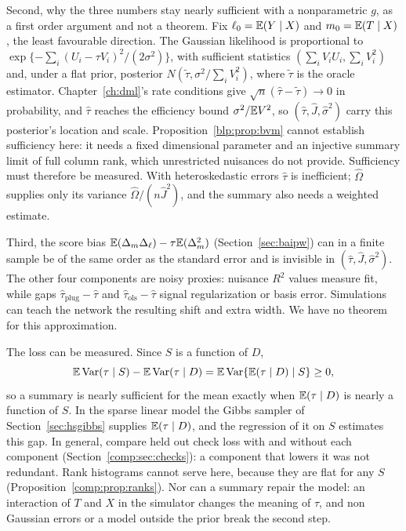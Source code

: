 Second, why the three numbers stay nearly sufficient with a nonparametric $g$, as a first order argument and not a theorem. Fix $\ell_0=\mathbb{E}(Y\mid X)$ and $m_0=\mathbb{E}(T\mid X)$, the least favourable direction. The Gaussian likelihood is proportional to $\exp\{-\sum_i(U_i-\tau V_i)^2/(2\sigma^2)\}$, with sufficient statistics $(\sum_iV_iU_i,\sum_iV_i^2)$ and, under a flat prior, posterior $N(\tilde\tau,\sigma^2/\sum_iV_i^2)$, where $\tilde\tau$ is the oracle estimator. Chapter~\ref{ch:dml}'s rate conditions give $\sqrt n(\hat\tau-\tilde\tau)\to0$ in probability, and $\hat\tau$ reaches the efficiency bound $\sigma^2/\mathbb{E} V^2$, so $(\hat\tau,\hat J,\hat\sigma^2)$ carry this posterior's location and scale. Proposition~\ref{blp:prop:bvm} cannot establish sufficiency here: it needs a fixed dimensional parameter and an injective summary limit of full column rank, which unrestricted nuisances do not provide. Sufficiency must therefore be measured. With heteroskedastic errors $\hat\tau$ is inefficient; $\hat\Omega$ supplies only its variance $\hat\Omega/(n\hat J^2)$, and the summary also needs a weighted estimate.

Third, the score bias $\mathbb{E}(\Delta_m\Delta_\ell)-\tau\mathbb{E}(\Delta_m^2)$ (Section~\ref{sec:baipw}) can in a finite sample be of the same order as the standard error and is invisible in $(\hat\tau,\hat J,\hat\sigma^2)$. The other four components are noisy proxies: nuisance $R^2$ values measure fit, while gaps $\hat\tau_{\mathrm{plug}}-\hat\tau$ and $\hat\tau_{\mathrm{ols}}-\hat\tau$ signal regularization or basis error. Simulations can teach the network the resulting shift and extra width. We have no theorem for this approximation.

The loss can be measured. Since $S$ is a function of $D$,
\[
\mathbb{E}\,\mathrm{Var}(\tau \mid S) - \mathbb{E}\,\mathrm{Var}(\tau \mid D) = \mathbb{E}\,\mathrm{Var}\{\mathbb{E}(\tau \mid D) \mid S\} \geq 0,
\]
so a summary is nearly sufficient for the mean exactly when $\mathbb{E}(\tau \mid D)$ is nearly a function of $S$. In the sparse linear model the Gibbs sampler of Section~\ref{sec:hsgibbs} supplies $\mathbb{E}(\tau \mid D)$, and the regression of it on $S$ estimates this gap. In general, compare held out check loss with and without each component (Section~\ref{comp:sec:checks}): a component that lowers it was not redundant. Rank histograms cannot serve here, because they are flat for any $S$ (Proposition~\ref{comp:prop:ranks}). Nor can a summary repair the model: an interaction of $T$ and $X$ in the simulator changes the meaning of $\tau$, and non Gaussian errors or a model outside the prior break the second step.

